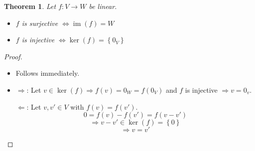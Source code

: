 \documentclass[a4paper,landscape,twocolumn]{article}
\newcommand\set[1]{\left\{#1\right\}}
\newtheorem{theorem}{Theorem}
\DeclareMathOperator\image{im} %
\DeclareMathOperator\kernel{ker} %
\begin{document}
\begin{theorem}
  \label{satz-5-20}
  Let $f: V \rightarrow W$ be linear.
  \begin{itemize}
    \item $f$ is surjective $\Leftrightarrow \image(f) = W$
    \item $f$ is injective $\Leftrightarrow \kernel(f) = \set{0_V}$
  \end{itemize}
\end{theorem}
\begin{proof}
  \begin{itemize}
    \item Follows immediately.
    \item $\Rightarrow$: Let $v \in \kernel(f) \Rightarrow f(v) = 0_W = f(0_V)$
      and $f$ is injective $\Rightarrow v = 0_v$.

      $\Leftarrow$: Let $v,v' \in V$ with $f(v) = f(v')$.
      \[ 0 = f(v) - f(v') = f(v - v') \]
      \[ \Rightarrow v - v' \in \kernel(f) = \set{0} \]
      \[ \Rightarrow v = v' \]
  \end{itemize}
\end{proof}
\end{document}
